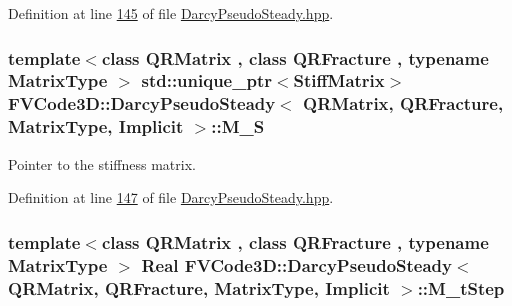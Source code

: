 Definition at line \hyperlink{DarcyPseudoSteady_8hpp_source_l00145}{145} of file \hyperlink{DarcyPseudoSteady_8hpp_source}{Darcy\+Pseudo\+Steady.\+hpp}.

\subsubsection[{\texorpdfstring{M\+\_\+S}{M_S}}]{\setlength{\rightskip}{0pt plus 5cm}template$<$class Q\+R\+Matrix , class Q\+R\+Fracture , typename Matrix\+Type $>$ std\+::unique\+\_\+ptr$<${\bf Stiff\+Matrix}$>$ {\bf F\+V\+Code3\+D\+::\+Darcy\+Pseudo\+Steady}$<$ Q\+R\+Matrix, Q\+R\+Fracture, Matrix\+Type, {\bf Implicit} $>$\+::M\+\_\+S\hspace{0.3cm}{\ttfamily [protected]}}\hypertarget{classFVCode3D_1_1DarcyPseudoSteady_3_01QRMatrix_00_01QRFracture_00_01MatrixType_00_01Implicit_01_4_a2ec0b47ef1237ba7abfaa11857d656c7}{}\label{classFVCode3D_1_1DarcyPseudoSteady_3_01QRMatrix_00_01QRFracture_00_01MatrixType_00_01Implicit_01_4_a2ec0b47ef1237ba7abfaa11857d656c7}


Pointer to the stiffness matrix. 



Definition at line \hyperlink{DarcyPseudoSteady_8hpp_source_l00147}{147} of file \hyperlink{DarcyPseudoSteady_8hpp_source}{Darcy\+Pseudo\+Steady.\+hpp}.

\subsubsection[{\texorpdfstring{M\+\_\+t\+Step}{M_tStep}}]{\setlength{\rightskip}{0pt plus 5cm}template$<$class Q\+R\+Matrix , class Q\+R\+Fracture , typename Matrix\+Type $>$ {\bf Real} {\bf F\+V\+Code3\+D\+::\+Darcy\+Pseudo\+Steady}$<$ Q\+R\+Matrix, Q\+R\+Fracture, Matrix\+Type, {\bf Implicit} $>$\+::M\+\_\+t\+Step\hspace{0.3cm}{\ttfamily [protected]}}\hypertarget{classFVCode3D_1_1DarcyPseudoSteady_3_01QRMatrix_00_01QRFracture_00_01MatrixType_00_01Implicit_01_4_ab26cff1a6ae988d44f437d290e29ed61}{}\label{classFVCode3D_1_1DarcyPseudoSteady_3_01QRMatrix_00_01QRFracture_00_01MatrixType_00_01Implicit_01_4_ab26cff1a6ae988d44f437d290e29ed61}



